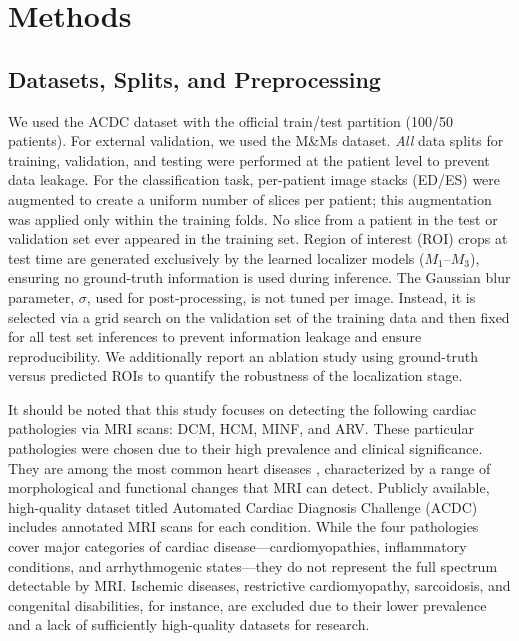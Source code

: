 \documentclass[fleqn,10pt]{wlscirep}
\begin{document}
\section*{Methods}

\subsection*{Datasets, Splits, and Preprocessing}
We used the ACDC dataset\cite{Bernard:2018} with the official train/test partition (100/50 patients). For external validation, we used the M\&Ms dataset\cite{Campello:2021}. \emph{All} data splits for training, validation, and testing were performed at the patient level to prevent data leakage. For the classification task, per-patient image stacks (ED/ES) were augmented to create a uniform number of slices per patient; this augmentation was applied only within the training folds. No slice from a patient in the test or validation set ever appeared in the training set. 
Region of interest (ROI) crops at test time are generated exclusively by the learned localizer models ($M_1$--$M_3$), ensuring no ground-truth information is used during inference. The Gaussian blur parameter, $\sigma$, used for post-processing, is not tuned per image. Instead, it is selected via a grid search on the validation set of the training data and then fixed for all test set inferences to prevent information leakage and ensure reproducibility. We additionally report an ablation study using ground-truth versus predicted ROIs to quantify the robustness of the localization stage.

It should be noted that this study focuses on detecting the following cardiac pathologies via MRI scans: DCM, HCM, MINF, and ARV. These particular pathologies were chosen due to their high prevalence and clinical significance. They are among the most common heart diseases \cite{Wang:2023,McKenna:2017}, characterized by a range of morphological and functional changes that MRI can detect. Publicly available, high-quality dataset titled Automated Cardiac Diagnosis Challenge (ACDC) \cite{Bernard:2018} includes annotated MRI scans for each condition. While the four pathologies cover major categories of cardiac disease---cardiomyopathies, inflammatory conditions, and arrhythmogenic states---they do not represent the full spectrum detectable by MRI. Ischemic diseases, restrictive cardiomyopathy, sarcoidosis, and congenital disabilities, for instance, are excluded due to their lower prevalence and a lack of sufficiently high-quality datasets for research.
\end{document}
